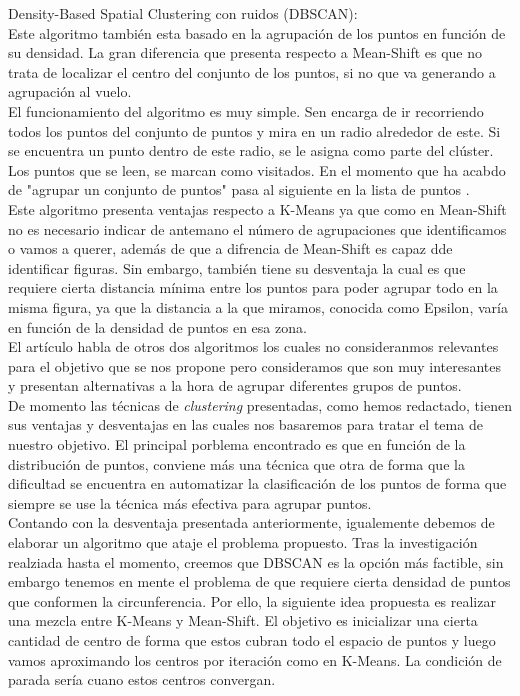 \documentclass[conference,a4paper]{IEEEtran}
\begin{document}
Density-Based Spatial Clustering con ruidos (DBSCAN):\\

Este algoritmo también esta basado en la agrupación de los puntos en función de su densidad. La gran diferencia que presenta respecto a Mean-Shift es que no trata de localizar el centro del conjunto de los puntos, si no que va generando a agrupación al vuelo.\\

El funcionamiento del algoritmo es muy simple. Sen encarga de ir recorriendo todos los puntos del conjunto de puntos y mira en un radio alrededor de este. Si se encuentra un punto dentro de este radio, se le asigna como parte del clúster. Los puntos que se leen, se marcan como visitados. En el momento que ha acabdo de "agrupar un conjunto de puntos" pasa al siguiente en la lista de puntos .\\

Este algoritmo presenta ventajas respecto a K-Means ya que como en Mean-Shift no es necesario indicar de antemano el número de agrupaciones que identificamos o vamos a querer, además de  que a difrencia de Mean-Shift es capaz dde identificar figuras. Sin embargo, también tiene su desventaja la cual es que requiere cierta distancia mínima entre los puntos para poder agrupar todo en la misma figura, ya que la distancia a la que miramos, conocida como Epsilon, varía en función de la densidad de puntos en esa zona.\\

El artículo habla de otros dos algoritmos los cuales no consideranmos relevantes para el objetivo que se nos propone pero consideramos que son muy interesantes  y presentan alternativas a la hora de agrupar diferentes grupos de puntos.\\

De momento las técnicas de \textit{clustering} presentadas, como hemos redactado, tienen sus ventajas y desventajas en las cuales nos basaremos para tratar el tema de nuestro objetivo. El principal porblema encontrado es que en función de la distribución de puntos, conviene más una técnica que otra de forma que la dificultad se encuentra en automatizar la clasificación de los puntos de forma que siempre se use la técnica más efectiva para agrupar puntos.\\

Contando con la desventaja presentada anteriormente, igualemente debemos de elaborar un algoritmo que ataje el problema propuesto. Tras la investigación realziada hasta el momento, creemos que DBSCAN es la opción más factible, sin embargo tenemos en  mente el problema de que requiere cierta densidad de puntos que conformen la circunferencia. Por ello, la siguiente idea propuesta es realizar una mezcla entre K-Means y Mean-Shift. El objetivo es inicializar una cierta cantidad de centro de forma que estos cubran todo el espacio de puntos y luego vamos aproximando los centros por iteración como en K-Means. La condición de parada sería cuano estos centros convergan. \\
\end{document}
